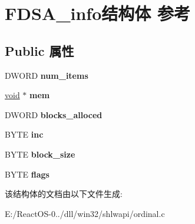 \hypertarget{struct_f_d_s_a__info}{}\section{F\+D\+S\+A\+\_\+info结构体 参考}
\label{struct_f_d_s_a__info}
\subsection*{Public 属性}
\begin{DoxyCompactItemize}
\item 
\mbox{\label{struct_f_d_s_a__info_a5ab596051724e4d192274ab8920c3bf6}} 
D\+W\+O\+RD {\bfseries num\+\_\+items}
\item 
\mbox{\label{struct_f_d_s_a__info_a6b43f1e57e312802fb872dc35d0f6936}} 
\hyperlink{interfacevoid}{void} $\ast$ {\bfseries mem}
\item 
\mbox{\label{struct_f_d_s_a__info_a4486171cdadfd25da71a32d2c23dc10f}} 
D\+W\+O\+RD {\bfseries blocks\+\_\+alloced}
\item 
\mbox{\label{struct_f_d_s_a__info_ab99a64d496297bed2586326aaaa37f38}} 
B\+Y\+TE {\bfseries inc}
\item 
\mbox{\label{struct_f_d_s_a__info_a385556d2e0d0dc27937493a5e97414b3}} 
B\+Y\+TE {\bfseries block\+\_\+size}
\item 
\mbox{\label{struct_f_d_s_a__info_a4039cd9758603e5e03f88630f0294864}} 
B\+Y\+TE {\bfseries flags}
\end{DoxyCompactItemize}


该结构体的文档由以下文件生成\+:\begin{DoxyCompactItemize}
\item 
E\+:/\+React\+O\+S-\/0../dll/win32/shlwapi/ordinal.\+c\end{DoxyCompactItemize}
